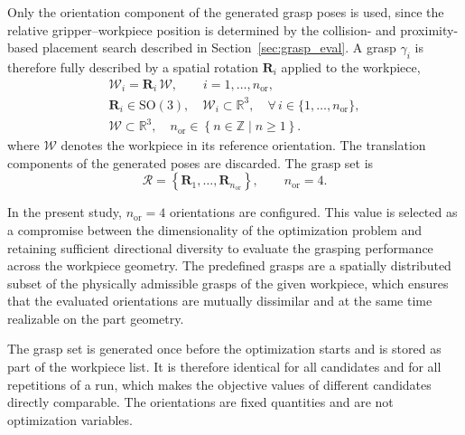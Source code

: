 Only the orientation component of the generated grasp poses is used, since the relative
gripper--workpiece position is determined by the collision- and proximity-based placement search
described in Section~\ref{sec:grasp_eval}. A grasp $\gamma_i$ is therefore fully described by a
spatial rotation $\mathbf{R}_i$ applied to the workpiece,
\begin{equation}
    \label{eq:grasp_rotation}
    \begin{gathered}
        \mathcal{W}_i = \mathbf{R}_i\,\mathcal{W},
        \qquad
        i = 1,\ldots,n_{\mathrm{or}},
        \\[4pt]
        \mathbf{R}_i \in \mathrm{SO}(3),
        \quad
        \mathcal{W}_i \subset \mathbb{R}^{3},
        \quad
        \forall\, i \in \{1,\ldots,n_{\mathrm{or}}\},
        \\[2pt]
        \mathcal{W} \subset \mathbb{R}^{3},
        \quad
        n_{\mathrm{or}} \in \left\{ n \in \mathbb{Z} \mid n \ge 1 \right\}.
    \end{gathered}
\end{equation}
where $\mathcal{W}$ denotes the workpiece in its reference orientation. The translation components
of the generated poses are discarded. The grasp set is
\begin{equation}
    \mathcal{R}
    =
    \left\{
        \mathbf{R}_1,\ldots,\mathbf{R}_{n_{\mathrm{or}}}
    \right\},
    \qquad
    n_{\mathrm{or}} = 4 .
\end{equation}


In the present study, $n_{\mathrm{or}} = 4$ orientations are configured. This value is selected as a compromise between the dimensionality of the
optimization problem and retaining sufficient directional diversity to evaluate the grasping performance across the workpiece geometry.
The predefined grasps are a spatially
distributed subset of the physically admissible grasps of the given workpiece, which ensures that the
evaluated orientations are mutually dissimilar and at the same time realizable on the part geometry.

The grasp set is generated once before the optimization starts and is stored as part of the workpiece list. It is therefore identical for all
candidates and for all repetitions of a run, which makes the objective values of different candidates directly comparable. The orientations are fixed
quantities and are not optimization variables.

